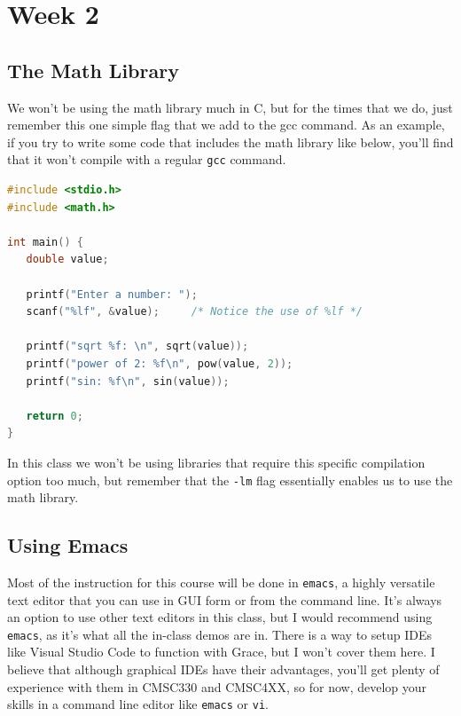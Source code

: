 \documentclass[english, 10pt]{article}
\begin{document}
\section{Week 2}

\subsection{The Math Library}

We won't be using the math library much in C, but for the times that we do, just remember this one simple flag that we add to the gcc command. As an example, if you try to write some code that includes the math library like below, you'll find that it won't compile with a regular \texttt{gcc} command. 

{\centering
\begin{lstlisting}[language=C]
#include <stdio.h>
#include <math.h>

int main() {
   double value;

   printf("Enter a number: ");
   scanf("%lf", &value);     /* Notice the use of %lf */

   printf("sqrt %f: \n", sqrt(value));
   printf("power of 2: %f\n", pow(value, 2));
   printf("sin: %f\n", sin(value));

   return 0;
}
\end{lstlisting}
}

In this class we won't be using libraries that require this specific compilation option too much, but remember that the \texttt{-lm} flag essentially enables us to use the math library.

\subsection{Using Emacs}

Most of the instruction for this course will be done in \texttt{emacs}, a highly versatile text editor that you can use in GUI form or from the command line. It's always an option to use other text editors in this class, but I would recommend using \texttt{emacs}, as it's what all the in-class demos are in. There is a way to setup IDEs like Visual Studio Code to function with Grace, but I won't cover them here. I believe that although graphical IDEs have their advantages, you'll get plenty of experience with them in CMSC330 and CMSC4XX, so for now, develop your skills in a command line editor like \texttt{emacs} or \texttt{vi}.\newline
\end{document}
